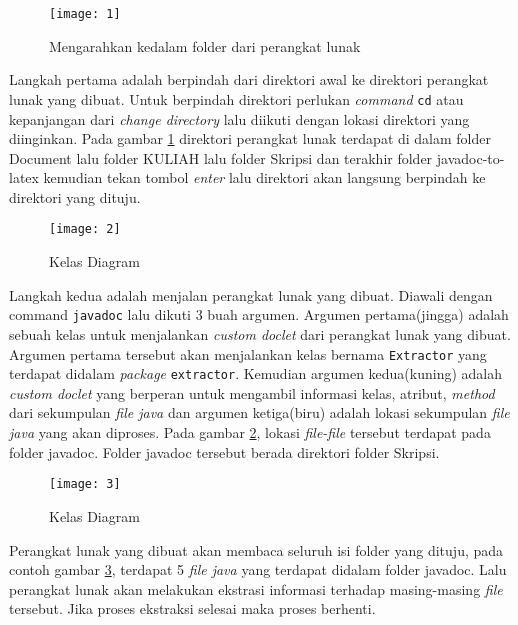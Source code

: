 \begin{figure}[H]
	\centering  
	\texttt{[image: 1]}  
	\caption[Kelas Diagram]{Mengarahkan kedalam folder dari perangkat lunak} 
	\label{fig:1} 
\end{figure}
Langkah pertama adalah berpindah dari direktori awal ke direktori perangkat lunak yang dibuat. Untuk berpindah direktori perlukan {\it command} \texttt{cd} atau kepanjangan dari {\it change directory} lalu diikuti dengan lokasi direktori yang diinginkan. Pada gambar \ref{fig:1} direktori perangkat lunak terdapat di dalam folder Document lalu folder KULIAH lalu folder Skripsi dan terakhir folder javadoc-to-latex kemudian tekan tombol {\it enter} lalu direktori akan langsung berpindah ke direktori yang dituju.

\begin{figure}[H]
	\centering  
	\texttt{[image: 2]}  
	\caption[Kelas Diagram]{Kelas Diagram} 
	\label{fig:2} 
\end{figure}
Langkah kedua adalah menjalan perangkat lunak yang dibuat. Diawali dengan command \texttt{javadoc} lalu dikuti 3 buah argumen. Argumen pertama(jingga) adalah sebuah kelas untuk menjalankan {\it custom doclet} dari perangkat lunak yang dibuat. Argumen pertama tersebut akan menjalankan kelas bernama \texttt{Extractor} yang terdapat didalam {\it package} \texttt{extractor}. Kemudian argumen kedua(kuning) adalah {\it custom doclet} yang berperan untuk mengambil informasi kelas, atribut, {\it method} dari sekumpulan {\it file java} dan argumen ketiga(biru) adalah lokasi sekumpulan {\it file java} yang akan diproses. Pada gambar \ref{fig:2}, lokasi {\it file-file} tersebut terdapat pada folder javadoc. Folder javadoc tersebut berada direktori folder Skripsi.

\begin{figure}[H]
	\centering  
	\texttt{[image: 3]}  
	\caption[Kelas Diagram]{Kelas Diagram} 
	\label{fig:3} 
\end{figure}
Perangkat lunak yang dibuat akan membaca seluruh isi folder yang dituju, pada contoh gambar \ref{fig:3}, terdapat 5 {\it file java} yang terdapat didalam folder javadoc. Lalu perangkat lunak akan melakukan ekstrasi informasi terhadap masing-masing {\it file} tersebut. Jika proses ekstraksi selesai maka proses berhenti.

























